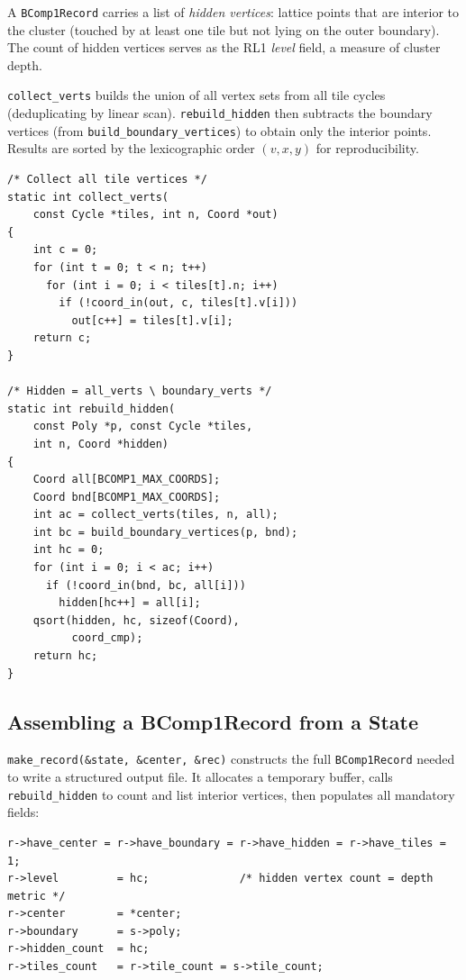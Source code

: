 \documentclass[10pt,a4paper]{article}
\let\polysubsection\subsection
\renewcommand\subsection{\needspace{0.12\textheight}\polysubsection}
\newcommand{\code}[1]{\texttt{\small #1}}
\begin{document}
\begin{tcolorbox}[dualbox, title={\code{rebuild\_hidden} and \code{collect\_verts}}]
  A \code{BComp1Record} carries a list of \emph{hidden vertices}: lattice
  points that are interior to the cluster (touched by at least one tile
  but not lying on the outer boundary).  The count of hidden vertices
  serves as the RL1 \emph{level} field, a measure of cluster depth.

  \code{collect\_verts} builds the union of all vertex sets from all tile
  cycles (deduplicating by linear scan).  \code{rebuild\_hidden} then
  subtracts the boundary vertices (from \code{build\_boundary\_vertices})
  to obtain only the interior points.  Results are sorted by the
  lexicographic order $(v, x, y)$ for reproducibility.
\tcblower
\begin{verbatim}
/* Collect all tile vertices */
static int collect_verts(
    const Cycle *tiles, int n, Coord *out)
{
    int c = 0;
    for (int t = 0; t < n; t++)
      for (int i = 0; i < tiles[t].n; i++)
        if (!coord_in(out, c, tiles[t].v[i]))
          out[c++] = tiles[t].v[i];
    return c;
}

/* Hidden = all_verts \ boundary_verts */
static int rebuild_hidden(
    const Poly *p, const Cycle *tiles,
    int n, Coord *hidden)
{
    Coord all[BCOMP1_MAX_COORDS];
    Coord bnd[BCOMP1_MAX_COORDS];
    int ac = collect_verts(tiles, n, all);
    int bc = build_boundary_vertices(p, bnd);
    int hc = 0;
    for (int i = 0; i < ac; i++)
      if (!coord_in(bnd, bc, all[i]))
        hidden[hc++] = all[i];
    qsort(hidden, hc, sizeof(Coord),
          coord_cmp);
    return hc;
}
\end{verbatim}
\end{tcolorbox}

\subsection{Assembling a BComp1Record from a State}

\code{make\_record(\&state, \&center, \&rec)} constructs the full
\code{BComp1Record} needed to write a structured output file.
It allocates a temporary buffer, calls \code{rebuild\_hidden} to count
and list interior vertices, then populates all mandatory fields:

\begin{verbatim}
r->have_center = r->have_boundary = r->have_hidden = r->have_tiles = 1;
r->level         = hc;              /* hidden vertex count = depth metric */
r->center        = *center;
r->boundary      = s->poly;
r->hidden_count  = hc;
r->tiles_count   = r->tile_count = s->tile_count;
\end{verbatim}
\end{document}
